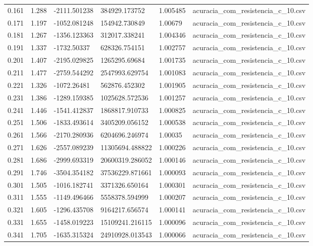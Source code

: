 \begin{table}
\begin{tabular}{llllll}
0.161 & 1.288 & -2111.501238 & 384929.173752 & 1.005485 & acuracia\_com\_resistencia\_c\_10.csv \\
0.171 & 1.197 & -1052.081248 & 154942.730849 & 1.00679 & acuracia\_com\_resistencia\_c\_10.csv \\
0.181 & 1.267 & -1356.123363 & 312017.338241 & 1.004346 & acuracia\_com\_resistencia\_c\_10.csv \\
0.191 & 1.337 & -1732.50337 & 628326.754151 & 1.002757 & acuracia\_com\_resistencia\_c\_10.csv \\
0.201 & 1.407 & -2195.029825 & 1265295.69684 & 1.001735 & acuracia\_com\_resistencia\_c\_10.csv \\
0.211 & 1.477 & -2759.544292 & 2547993.629754 & 1.001083 & acuracia\_com\_resistencia\_c\_10.csv \\
0.221 & 1.326 & -1072.26481 & 562876.452302 & 1.001905 & acuracia\_com\_resistencia\_c\_10.csv \\
0.231 & 1.386 & -1289.159385 & 1025628.572536 & 1.001257 & acuracia\_com\_resistencia\_c\_10.csv \\
0.241 & 1.446 & -1541.412837 & 1868817.910733 & 1.000825 & acuracia\_com\_resistencia\_c\_10.csv \\
0.251 & 1.506 & -1833.493614 & 3405209.056152 & 1.000538 & acuracia\_com\_resistencia\_c\_10.csv \\
0.261 & 1.566 & -2170.280936 & 6204696.246974 & 1.00035 & acuracia\_com\_resistencia\_c\_10.csv \\
0.271 & 1.626 & -2557.089239 & 11305694.488822 & 1.000226 & acuracia\_com\_resistencia\_c\_10.csv \\
0.281 & 1.686 & -2999.693319 & 20600319.286052 & 1.000146 & acuracia\_com\_resistencia\_c\_10.csv \\
0.291 & 1.746 & -3504.354182 & 37536229.871661 & 1.000093 & acuracia\_com\_resistencia\_c\_10.csv \\
0.301 & 1.505 & -1016.182741 & 3371326.650164 & 1.000301 & acuracia\_com\_resistencia\_c\_10.csv \\
0.311 & 1.555 & -1149.496466 & 5558378.594999 & 1.000207 & acuracia\_com\_resistencia\_c\_10.csv \\
0.321 & 1.605 & -1296.435708 & 9164217.656574 & 1.000141 & acuracia\_com\_resistencia\_c\_10.csv \\
0.331 & 1.655 & -1458.019223 & 15109241.216115 & 1.000096 & acuracia\_com\_resistencia\_c\_10.csv \\
0.341 & 1.705 & -1635.315324 & 24910928.013543 & 1.000066 & acuracia\_com\_resistencia\_c\_10.csv \\

\end{tabular}
\end{table}
